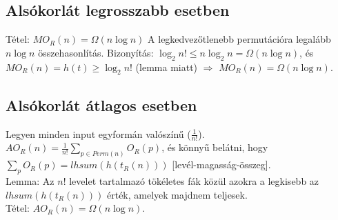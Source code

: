 \documentclass[margin=0px]{article}
\begin{document}
	\subsection{Alsókorlát legrosszabb esetben}
	
	Tétel: $MO_R(n) = \Omega(n\log{n})$ A legkedvezőtlenebb permutációra legalább $n\log{n}$ összehasonlítás. Bizonyítás: $\log_2{n!} \leq n\log_2{n} = \Omega(n\log{n})$, és $MO_R(n)=h(t) \geq \log_2{n!}$ (lemma miatt) $\Rightarrow$ $MO_R(n)=\Omega(n\log{n})$.
	
	\subsection{Alsókorlát átlagos esetben}
	
	Legyen minden input egyformán valószínű ($\frac{1}{n!}$). \\
	$AO_R(n) = \frac{1}{n!}\sum_{p \in Perm(n)}{O_R(p)}$, és könnyű belátni, hogy $\sum_{p}{O_R(p)} = lhsum(h(t_R(n)))$ [levél-magasság-összeg]. \\
	Lemma: Az $n!$ levelet tartalmazó tökéletes fák közül azokra a legkisebb az $lhsum(h(t_R(n)))$ érték, amelyek majdnem teljesek. \\
	Tétel: $AO_R(n) = \Omega(n\log{n})$.
	
\end{document}
